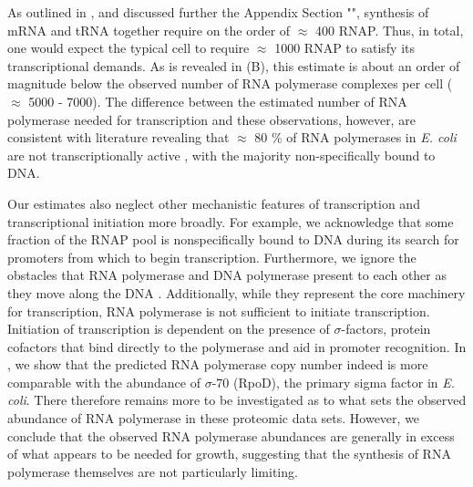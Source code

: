 As outlined in , and discussed further the Appendix
Section "", synthesis of mRNA and tRNA together require
on the order of $\approx$ 400 RNAP. Thus, in total, one would expect the
typical cell to require $\approx$ 1000 RNAP to satisfy its transcriptional
demands. As is revealed in (B), this estimate is about an
order of magnitude below the observed number of RNA polymerase complexes per
cell ($\approx$ 5000 - 7000). The difference between the estimated number of
RNA polymerase needed for transcription and these observations, however, are
consistent with literature revealing that $\approx$ 80 \% of RNA
polymerases in \textit{E. coli} are not transcriptionally active
\citep{klumpp2008, patrick2015}, with the majority non-specifically bound to
DNA.

Our estimates also neglect other mechanistic features of transcription and
transcriptional initiation more broadly. For example, we acknowledge that
some fraction of the RNAP pool is nonspecifically bound to DNA during its
search for promoters from which to begin transcription. Furthermore, we
ignore the obstacles that RNA polymerase and DNA polymerase present to each
other as they move along the DNA \citep{finkelstein2013}. Additionally, while
they represent the core machinery for transcription, RNA polymerase is not
sufficient to initiate transcription. Initiation of transcription is
dependent on the presence of $\sigma$-factors, protein cofactors that bind
directly to the polymerase \citep{browning2016} and aid in promoter
recognition. In , we show that the predicted
RNA polymerase copy number indeed is more comparable with the abundance of
$\sigma$-70 (RpoD), the primary sigma factor in \textit{E. coli}. There
therefore remains more to be investigated as to what sets the observed
abundance of RNA polymerase in these proteomic data sets. However, we
conclude that the observed RNA polymerase abundances are generally in excess
of what appears to be needed for growth, suggesting that the synthesis of RNA
polymerase themselves are not particularly limiting.


